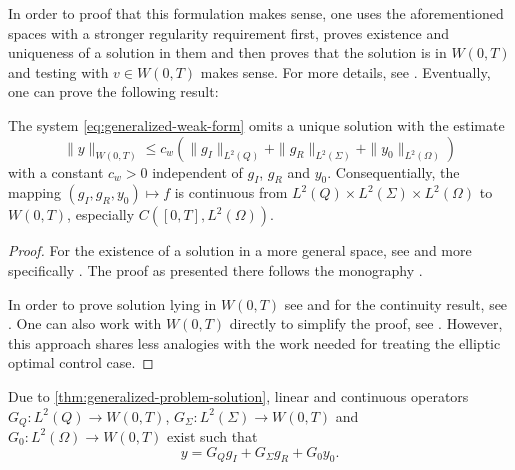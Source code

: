 \documentclass[../thesis.tex]{subfiles}
\begin{document}
In order to proof that this formulation makes sense, one uses the aforementioned spaces with a stronger regularity requirement first, proves existence and uniqueness of a solution in them and then proves that the solution is in $W(0, T)$ and testing with $v \in W(0, T)$ makes sense. For more details, see \cite[3.3 Schwache Lösungen in $W^{1, 0}_2(Q)$]{Troeltzsch}.
Eventually, one can prove the following result:
\begin{theorem}
\label{thm:generalized-problem-solution}
The system \cref{eq:generalized-weak-form} omits a unique solution with the estimate
\[
	\| y \|_{W(0, T)} \leq c_w ( \| g_I \|_{L^2(Q)} + \| g_R \|_{L^2(\Sigma)} + \| y_0 \|_{L^2(\Omega)} )
\] 
with a constant $c_w > 0$ independent of $g_I$, $g_R$ and $y_0$.
Consequentially, the mapping $(g_I, g_R, y_0) \mapsto f$ is continuous from $L^2(Q) \times L^2(\Sigma) \times L^2(\Omega)$ to $W(0, T)$, especially $C([0, T], L^2(\Omega))$.
\end{theorem}
\begin{proof}
For the existence of a solution in a more general space, see \cite[Satz 3.9, p.\ 112]{Troeltzsch} and more specifically \cite[Satz 7.9, p.\ 289]{Troeltzsch}. The proof as presented there follows the monography \cite{Ladyzhenskaya}.

In order to prove solution lying in $W(0, T)$ see \cite[Satz 3.12, p.\ 120]{Troeltzsch} and for the continuity result, see \cite[Satz 3.13, p.\ 121]{Troeltzsch}.
One can also work with $W(0, T)$ directly to simplify the proof, see \cite{Wloka}. However, this approach shares less analogies with the work needed for treating the elliptic optimal control case.
\end{proof}
Due to \cref{thm:generalized-problem-solution}, linear and continuous operators $G_Q : L^2(Q) \to W(0, T)$, $G_\Sigma : L^2(\Sigma) \to W(0, T)$ and $G_0 : L^2(\Omega) \to W(0, T)$ exist such that
\[
	y = G_Q g_I + G_\Sigma g_R + G_0 y_0.
\]
\end{document}
